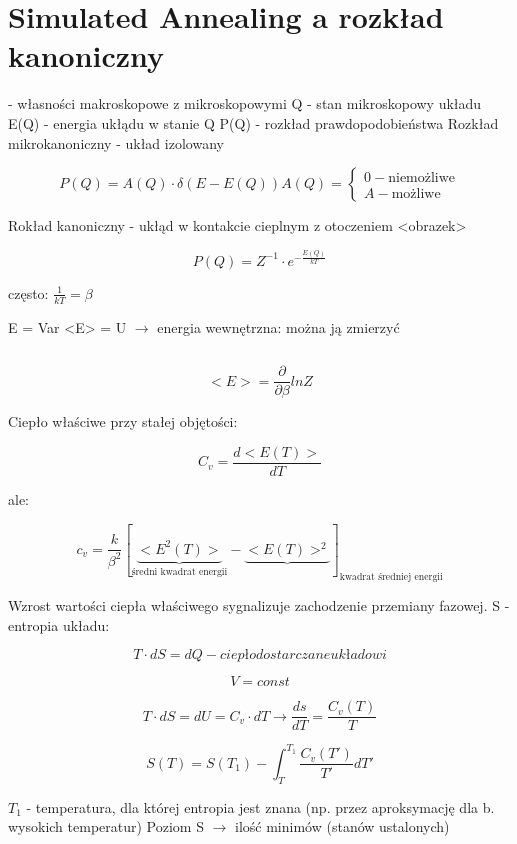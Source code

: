 \section{Simulated Annealing a rozkład kanoniczny}

- własności makroskopowe z mikroskopowymi
Q - stan mikroskopowy układu
E(Q) - energia ukłądu w stanie Q
P(Q) - rozkład prawdopodobieństwa 
Rozkład mikrokanoniczny - układ izolowany

$$
P(Q) = A(Q) \cdot \delta(E - E(Q))
A(Q) = \begin{cases}
0 - \text{niemożliwe} \\
A - \text{możliwe}
\end{cases}
$$

Rokład kanoniczny - ukłąd w kontakcie cieplnym z otoczeniem
<obrazek>

$$
P(Q) = Z^{-1} \cdot e^{-\frac{E(Q)}{kT}}
$$


często: $\frac{1}{kT} = \beta$

E = Var
<E> = U $\rightarrow$ energia wewnętrzna: można ją zmierzyć

$$
$$

$$
<E> = \frac{\partial}{\partial \beta} ln Z
$$

Ciepło właściwe przy stałej objętości:

$$
C_v = \frac{d<E(T)>}{dT}
$$

ale:

$$
c_v = \frac{k}{\beta^2}[\underbrace{<E^2(T)>}_{\text{średni kwadrat energii}} - \underbrace{<E(T)>^2}]_{\text{kwadrat średniej energii}}
$$

Wzrost wartości ciepła właściwego sygnalizuje zachodzenie przemiany fazowej.
S - entropia układu:

$$
T \cdot dS = dQ - ciepło dostarczane układowi
$$

$$
V = const
$$

$$
T \cdot dS = dU = C_v \cdot dT \rightarrow \frac{ds}{dT} = \frac{C_v(T)}{T}
$$

$$
S(T) = S(T_1) - \int_T^{T_1} \frac{C_v(T')}{T'}dT'
$$

$T_1$ - temperatura, dla której entropia jest znana (np. przez aproksymację dla b. wysokich temperatur)
Poziom S $\rightarrow$ ilość minimów (stanów ustalonych)

